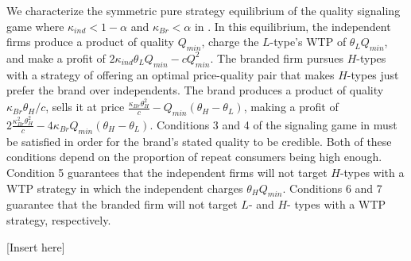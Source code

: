\documentclass[mksc,blindrev]{informs3} %
\begin{document}
We characterize the symmetric pure strategy equilibrium of the quality signaling game where $\kappa_{ind}<1-\alpha$ and $\kappa_{Br}<\alpha$ in . In this equilibrium, the independent firms produce a product of quality $Q_{min}$, charge the $L$-type's WTP of $\theta_LQ_{min}$, and make a profit of $2 \kappa_{ind} \theta_L Q_{min} - c Q_{min}^2$. The branded firm pursues $H$-types with a strategy of offering an optimal price-quality pair that makes $H$-types just prefer the brand over independents. The brand produces a product of quality $\kappa_{Br}\theta_H/c$, sells it at price $\frac{\kappa_{Br}\theta_H^2}{c}-Q_{min}(\theta_H-\theta_L)$, making a profit of $2\frac{\kappa_{Br}^2\theta_H^2}{c}-4\kappa_{Br} Q_{min}(\theta_H-\theta_L)$. Conditions 3 and 4 of the signaling game in  must be satisfied in order for the brand's stated quality to be credible. Both of these conditions depend on the proportion of repeat consumers being high enough. Condition 5 guarantees that the independent firms will not target $H$-types with a WTP strategy in which the independent charges $\theta_HQ_{min}$. Conditions 6 and 7 guarantee that the branded firm will not target $L$- and $H$- types with a WTP strategy, respectively. %

[Insert  here]
\end{document}
